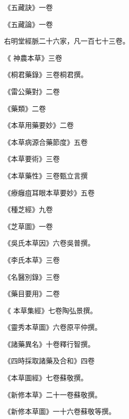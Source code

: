 \begin{pinyinscope}
 《五藏訣》一卷



 《五藏論》一卷



 右明堂經脈二十六家，凡一百七十三卷。



 《
 神農本草》三卷



 《桐君藥錄》三卷桐君撰。



 《雷公藥對》二卷



 《藥類》二卷



 《本草用藥要妙》二卷



 《本草病源合藥節度》五卷



 《本草要術》三卷



 《本草藥性》三卷甄立言撰



 《療癰疽耳眼本草要妙》五卷



 《種芝經》九卷



 《芝草圖》一卷



 《吳氏本草因》六卷吳普撰。



 《李氏本草》三卷



 《名醫別錄》三卷



 《藥目要用》二卷



 《
 本草集經》七卷陶弘景撰。



 《靈秀本草圖》六卷原平仲撰。



 《諸藥異名》十卷釋行智撰。



 《四時採取諸藥及合和》四卷



 《本草圖經》七卷蘇敬撰。



 《新修本草》二十一卷蘇敬撰。



 《新修本草圖》一十六卷蘇敬等撰。




\end{pinyinscope}
